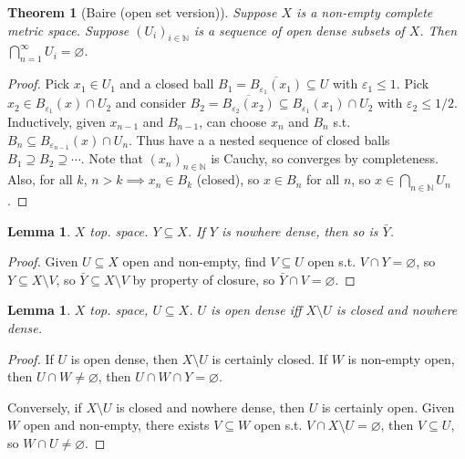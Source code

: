 \documentclass{article}
\newcommand{\e}{\varepsilon}
\theoremstyle{definition}
\theoremstyle{remark}
\theoremstyle{plain}
\newtheorem{lem}[defn]{Lemma}
\newtheorem{thm}[defn]{Theorem}
\newcommand{\NN}{\mathbb{N}}
\begin{document}
\begin{thm}[Baire (open set version)]
    Suppose $X$ is a non-empty complete metric space. Suppose $(U_i)_{i\in\NN}$ is a sequence of open dense subsets of $X$. Then $\bigcap_{n=1}^\infty U_i=\varnothing$.
\end{thm}
\begin{proof}
    Pick $x_1\in U_1$ and a closed ball $B_1=\overline{B_{\e_1}(x_1)}\subseteq U$ with $\e_1\le 1$. Pick $x_2\in B_{\e_1}(x)\cap U_2$ and consider $B_2=\overline{B_{\e_2}(x_2)}\subseteq B_{\e_1}(x_1)\cap U_2$ with $\e_2\le 1/2$. Inductively, given $x_{n-1}$ and $B_{n-1}$, can choose $x_n$ and $B_n$ s.t. $B_n\subseteq B_{\e_{n-1}}(x)\cap U_n$. Thus have a a nested sequence of closed balls $B_1\supseteq B_2\supseteq\cdots$. Note that $(x_n)_{n\in\NN}$ is Cauchy, so converges by completeness. Also, for all $k$, $n>k\implies x_n\in B_k$ (closed), so $x\in B_n$ for all $n$, so $x\in\bigcap_{n\in\NN} U_n$.


\end{proof}
\begin{lem}
    $X$ top. space. $Y\subseteq X$. If $Y$ is nowhere dense, then so is $\bar Y$. 
\end{lem}
\begin{proof}
    Given $U\subseteq X$ open and non-empty, find $V\subseteq U$ open s.t. $V\cap Y=\varnothing$, so $Y\subseteq X\setminus V$, so $\bar Y\subseteq X\setminus V$ by property of closure, so $\bar Y\cap V=\varnothing$. 
\end{proof}
\begin{lem}
    $X$ top. space, $U\subseteq X$. $U$ is open dense iff $X\setminus U$ is closed and nowhere dense.
\end{lem}
\begin{proof}
    If $U$ is open dense, then $X\setminus U$ is certainly closed. If $W$ is non-empty open, then $U\cap W\neq\varnothing$, then $U\cap W\cap Y=\varnothing$.

    Conversely, if $X\setminus U$ is closed and nowhere dense, then $U$ is certainly open. Given $W$ open and non-empty, there exists $V\subseteq W$ open s.t. $V\cap X\setminus U=\varnothing$, then $V\subseteq U$, so $W\cap U\neq\varnothing$.
\end{proof}
\end{document}
